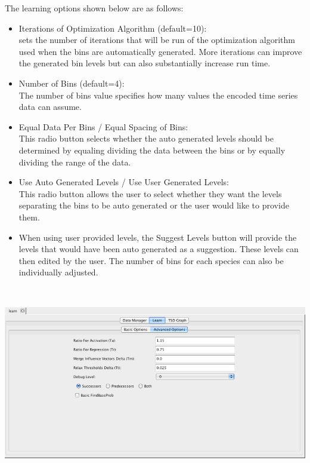 \documentclass[titlepage,11pt]{article}
\begin{document}
The learning options shown below are as follows:
\begin{itemize}
\item Iterations of Optimization Algorithm (default=10): \\
sets the number of iterations that will be run of the optimization algorithm 
used when the bins are automatically generated.  More iterations can improve 
the generated bin levels but can also substantially increase run time.
\item Number of Bins (default=4): \\
The number of bins value specifies how many values the
encoded time series data can assume.
\item Equal Data Per Bins / Equal Spacing of Bins: \\
This radio button selects whether the auto generated levels
should be determined by equaling dividing the data between the
bins or by equally dividing the range of the data. 
\item Use Auto Generated Levels / Use User Generated Levels: \\
This radio button allows the user to select whether they want
the levels separating the bins to be auto generated or the user
would like to provide them. 
\item When using user provided levels, the Suggest Levels
button will provide the levels that would have been auto
generated as a suggestion. These levels can then edited by the
user.  The number of bins for each species can also be individually adjusted.  
\end{itemize}
\begin{center}
\includegraphics[height=85mm]{screenshots/advLearn}
\end{center}
\end{document}
